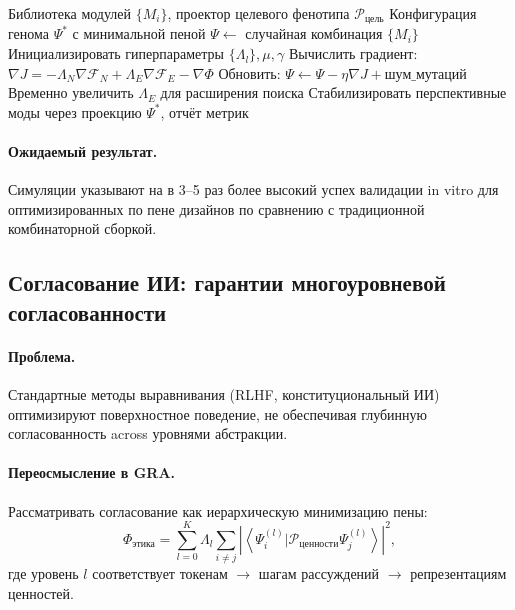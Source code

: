 \documentclass[11pt,a4paper]{article}
\theoremstyle{plain}
\theoremstyle{definition}
\theoremstyle{remark}
\newcommand{\Foam}{\Phi}
\newcommand{\Projector}{\mathcal{P}}
\newcommand{\Functional}{\mathcal{F}}
\newcommand{\grad}{\nabla}
\newcommand{\braket}[2]{\left\langle#1|#2\right\rangle}
\begin{document}
\begin{algorithm}[H]
\caption{GRA\_SynBio\_Design: сборка генома с минимизацией пены}
\label{alg:synbio}
\begin{algorithmic}[1]
\Require Библиотека модулей $\{M_i\}$, проектор целевого фенотипа $\Projector_{\text{цель}}$
\Ensure Конфигурация генома $\Psi^*$ с минимальной пеной
\State $\Psi \gets$ случайная комбинация $\{M_i\}$
\State Инициализировать гиперпараметры $\{\Lambda_l\}, \mu, \gamma$
\While{$\Foam[\Psi] > \epsilon$ или $\Functional_N[\Psi] < F_{\text{цель}}$}
    \State Вычислить градиент: $\grad J = -\Lambda_N \grad\Functional_N + \Lambda_E \grad\Functional_E - \grad\Foam$
    \State Обновить: $\Psi \gets \Psi - \eta \grad J + \text{шум\_мутаций}$
    \State {} 
        \State Временно увеличить $\Lambda_E$ для расширения поиска
        \State Стабилизировать перспективные моды через проекцию
    \EndIf
\EndWhile
\State \Return $\Psi^*$, отчёт метрик
\end{algorithmic}
\end{algorithm}

\paragraph{Ожидаемый результат.} Симуляции указывают на в 3--5 раз более высокий успех валидации in vitro для оптимизированных по пене дизайнов по сравнению с традиционной комбинаторной сборкой.

\subsection{Согласование ИИ: гарантии многоуровневой согласованности}

\paragraph{Проблема.} Стандартные методы выравнивания (RLHF, конституциональный ИИ) оптимизируют поверхностное поведение, не обеспечивая глубинную согласованность across уровнями абстракции.

\paragraph{Переосмысление в GRA.} Рассматривать согласование как иерархическую минимизацию пены:
\begin{equation}
\Foam_{\text{этика}} = \sum_{l=0}^K \Lambda_l \sum_{i \neq j} \left| \braket{\Psi_i^{(l)}}{\Projector_{\text{ценности}} \Psi_j^{(l)}} \right|^2,
\label{eq:ethics_foam}
\end{equation}
где уровень $l$ соответствует токенам $\to$ шагам рассуждений $\to$ репрезентациям ценностей.
\end{document}
